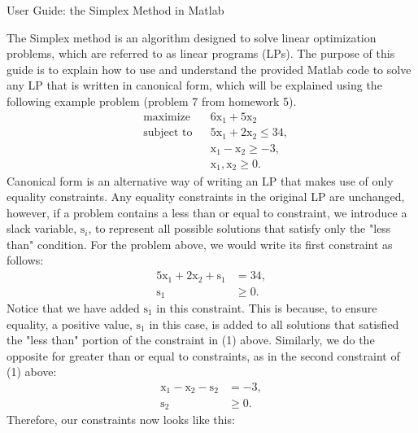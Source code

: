 \documentclass[12pt]{article}
\begin{document}
\begin{center}
	User Guide: the Simplex Method in Matlab
\end{center}
\quad The Simplex method is an algorithm designed to solve linear optimization problems, which are referred to as linear programs (LPs). The purpose of this guide is to explain how to use and understand the provided Matlab code to solve any LP that is written in canonical form, which will be explained using the following example problem (problem 7 from homework 5).
\begin{equation}
	\begin{aligned}
	& \text{maximize} 
	& & 6\text{x}_{1} + 5\text{x}_{2} \\
	& \text{subject to} 
	& & 5\text{x}_{1} + 2\text{x}_{2} \leq 34, \\
	&&& \text{x}_{1} - \text{x}_{2} \geq -3, \\
	&&& \text{x}_{1},\text{x}_{2} \geq 0.
	\end{aligned}
\end{equation}
\quad Canonical form is an alternative way of writing an LP that makes use of only equality constraints. Any equality constraints in the original LP are unchanged, however, if a problem contains a less than or equal to constraint, we introduce a slack variable, $\text{s}_{i}$, to represent all possible solutions that satisfy only the "less than" condition. For the problem above, we would write its first constraint as follows:
\begin{equation*}
	\begin{aligned}
	5\text{x}_{1} + 2\text{x}_{2} + \text{s}_{1} & = 34, \\
	\text{s}_{1} & \geq 0.
	\end{aligned}
\end{equation*}
\quad Notice that we have added $\text{s}_{1}$ in this constraint. This is because, to ensure equality, a positive value, $\text{s}_{1}$ in this case, is added to all solutions that satisfied the "less than" portion of the constraint in (1) above. Similarly, we do the opposite for greater than or equal to constraints, as in the second constraint of (1) above:
\begin{equation*}
	\begin{aligned}
	\text{x}_{1} - \text{x}_{2} - \text{s}_{2} & = -3, \\
	\text{s}_{2} & \geq 0.
	\end{aligned}
\end{equation*}
\quad Therefore, our constraints now looks like this:
\end{document}
